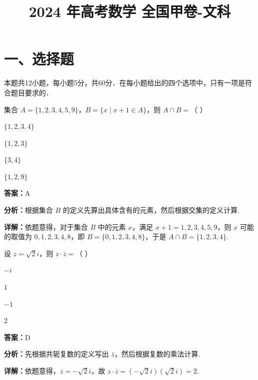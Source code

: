 ﻿\title{2024 年高考数学 全国甲卷-文科}
\date{}
\maketitle

\section*{一、选择题}
本题共12小题，每小题5分，共60分．在每小题给出的四个选项中，只有一项是符合题目要求的．

\begin{question}[points=5]
集合 $A = \{1, 2, 3, 4, 5, 9\}$，$B = \{x \mid x + 1 \in A\}$，则 $A \cap B =$（ ）
\begin{choices}
  \item $\{1, 2, 3, 4\}$
  \item $\{1, 2, 3\}$
  \item $\{3, 4\}$
  \item $\{1, 2, 9\}$
\end{choices}
\begin{solution}
\textbf{答案：}A

\textbf{分析：}根据集合 $B$ 的定义先算出具体含有的元素，然后根据交集的定义计算.

\textbf{详解：}依题意得，对于集合 $B$ 中的元素 $x$，满足 $x + 1 = 1, 2, 3, 4, 5, 9$，则 $x$ 可能的取值为 $0, 1, 2, 3, 4, 8$，即 $B = \{0, 1, 2, 3, 4, 8\}$，于是 $A \cap B = \{1, 2, 3, 4\}$.
\end{solution}
\end{question}

\begin{question}[points=5]
设 $z = \sqrt{2}i$，则 $z \cdot \overline{z} =$（ ）
\begin{choices}
  \item $-i$
  \item $1$
  \item $-1$
  \item $2$
\end{choices}
\begin{solution}
\textbf{答案：}D

\textbf{分析：}先根据共轭复数的定义写出 $\overline{z}$，然后根据复数的乘法计算.

\textbf{详解：}依题意得，$\overline{z} = -\sqrt{2}i$，故 $z \cdot \overline{z} = (-\sqrt{2}i)(\sqrt{2}i) = 2$.
\end{solution}
\end{question}

